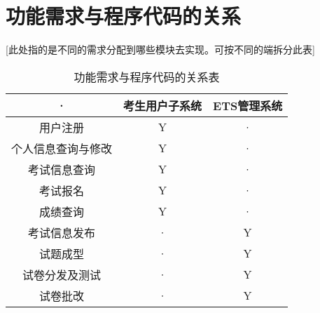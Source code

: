 \section{功能需求与程序代码的关系}
[此处指的是不同的需求分配到哪些模块去实现。可按不同的端拆分此表]
\begin{table}[htbp]
\centering
\caption{功能需求与程序代码的关系表} \label{tab:requirement-module}
\begin{tabular}{|c|c|c|}
    \hline
    · & 考生用户子系统 & ETS管理系统 \\
    \hline
    用户注册 & Y & · \\
    \hline
    个人信息查询与修改 & Y & · \\
    \hline
    考试信息查询 & Y & · \\
    \hline
    考试报名 & Y & · \\
    \hline
    成绩查询 & Y & · \\
    \hline
    考试信息发布 & · & Y \\
    \hline
    试题成型 & · & Y \\
    \hline
    试卷分发及测试 & · & Y \\
    \hline
    试卷批改 & · & Y \\
    \hline
\end{tabular}
\end{table}
